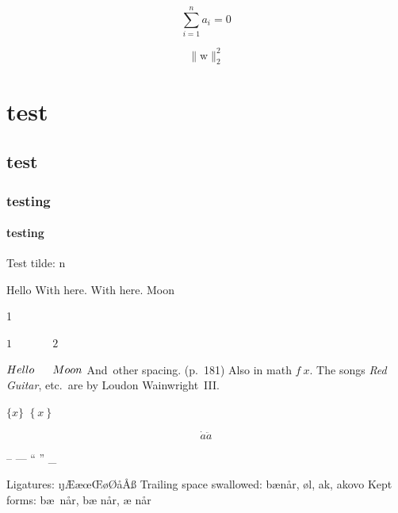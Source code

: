 \documentclass{minimal}
\begin{document}
\begin{equation}
  \sum_{i=1}^n a_i = 0
\end{equation}

$$\lVert \mathrm{w} \rVert_2^2$$

\chapter{test}

\section{test}

\subsection{testing}

\subsubsection{testing}

Test tilde: \tilde n

Hello
\thinspace
\medspace
\thickspace
\bigskip
\hspace{1em}
\hfill
\vspace{1em}
\vfill
With  here.
With  here.
Moon

1 \, \: \; \! \quad {}

$1 \, \: \; \! \quad \qquad 2$

$Hello
\thinspace
\medspace
\thickspace
\bigskip
\hspace{1em}
\hfill
\vspace{1em}
Moon$
And~other spacing. (p.~181) \citet[Sect.~3]{MyRef:2023}
Also in math $f~x$.
The songs \textit{Red Guitar}, etc.\ are by Loudon Wainwright~III\@.

$\{x\}$
$\left\{x\right\}$

\[
  \dot a
  \ddot a
\]

-- --- `` '' \_ \colon

Ligatures: \i \j \AE \ae \oe \OE \o \O \aa \AA \ss \dj \DJ
Trailing space swallowed: b\ae når, \o l, \dj ak, \DJ akovo
Kept forms: b\ae\ når, b\ae{} når, {\ae} når
\end{document}
